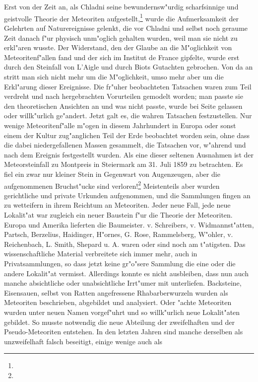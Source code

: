 \documentclass[a4paper, 11pt, oneside]{article}
\begin{document}
\section*{}
\paragraph{}
Erst von der Zeit an, als Chladni seine bewundernsw"urdig scharfsinnige und geistvolle Theorie der Meteoriten aufgestellt,\footnote{} wurde die Aufmerksamkeit der Gelehrten auf Naturereignisse gelenkt, die vor Chladni und selbst noch geraume Zeit danach f"ur physisch unm"oglich gehalten wurden, weil man sie nicht zu erkl"aren wusste. Der Widerstand, den der Glaube an die M"oglichkeit von Meteoritenf"allen fand und der sich im Institut de France gipfelte, wurde erst durch den Steinfall von L'Aigle und durch Biots Gutachten gebrochen. Von da an stritt man sich nicht mehr um die M"oglichkeit, umso mehr aber um die Erkl"arung dieser Ereignisse. Die fr"uher beobachteten Tatsachen waren zum Teil verdreht und nach hergebrachten Vorurteilen gemodelt worden; man passte sie den theoretischen Ansichten an und was nicht passte, wurde bei Seite gelassen oder willk"urlich ge"andert. Jetzt galt es, die wahren Tatsachen festzustellen. Nur wenige Meteoritenf"alle m"ogen in diesem Jahrhundert in Europa oder sonst einem der Kultur zug"anglichen Teil der Erde beobachtet worden sein, ohne dass die dabei niedergefallenen Massen gesammelt, die Tatsachen vor, w"ahrend und nach dem Ereignis festgestellt wurden. Als eine dieser seltenen Ausnahmen ist der Meteorsteinfall zu Montpreis in Steiermark am 31. Juli 1859 zu betrachten. Es fiel ein zwar nur kleiner Stein in Gegenwart von Augenzeugen, aber die aufgenommenen Bruchst"ucke sind verloren!\footnote{} Meistenteils aber wurden gerichtliche und private Urkunden aufgenommen, und die Sammlungen fingen an zu wetteifern in ihrem Reichtum an Meteoriten. Jeder neue Fall, jede neue Lokalit"at war zugleich ein neuer Baustein f"ur die Theorie der Meteoriten. Europa und Amerika lieferten die Baumeister. v. Schreibers, v. Widmannst"atten, Partsch, Berzelius, Haidinger, H"ornes, G. Rose, Rammelsberg, W"ohler, v. Reichenbach, L. Smith, Shepard u. A. waren oder sind noch am t"atigsten. Das wissenschaftliche Material verbreitete sich immer mehr, auch in Privatsammlungen, so dass jetzt keine gr"o"sere Sammlung die eine oder die andere Lokalit"at vermisst. Allerdings konnte es nicht ausbleiben, dass nun auch manche absichtliche oder unabsichtliche Irrt"umer mit unterliefen. Backsteine, Eisensauen, selbst von Ratten angefressene Rhabarberwurzeln wurden als Meteoriten beschrieben, abgebildet und analysiert. Oder "achte Meteoriten wurden unter neuen Namen vorgef"uhrt und so willk"urlich neue Lokalit"aten gebildet. So musste notwendig die neue Abteilung der zweifelhaften und der Pseudo-Meteoriten entstehen. In den letzten Jahren sind manche derselben als unzweifelhaft falsch beseitigt, einige wenige auch als 
\end{document}

